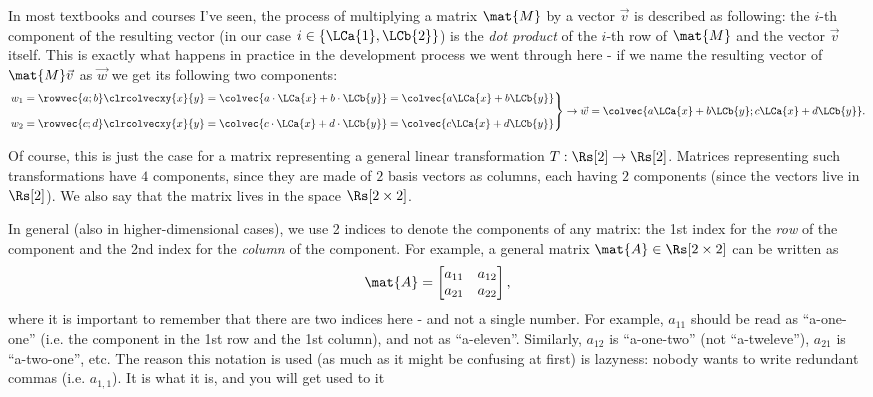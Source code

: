 In most textbooks and courses I've seen, the process of multiplying a matrix $\mat{M}$ by a vector $\vec{v}$ is described as following: the $i$-th component of the resulting vector (in our case $i\in\left\{\LCa{1},\LCb{2}\right\}$) is the \textit{dot product} of the $i$-th row of $\mat{M}$ and the vector $\vec{v}$ itself. This is exactly what happens in practice in the development process we went through here - if we name the resulting vector of $\mat{M}\vec{v}$ as $\vec{w}$ we get its following two components:
\begin{equation}
	\left.
	\begin{aligned}
		w_{1} & = \rowvec{a;b}\clrcolvecxy{x}{y} = \colvec{a\cdot\LCa{x}+b\cdot\LCb{y}} = \colvec{a\LCa{x}+b\LCb{y}} \\[2ex]
		w_{2} & = \rowvec{c;d}\clrcolvecxy{x}{y} = \colvec{c\cdot\LCa{x}+d\cdot\LCb{y}} = \colvec{c\LCa{x}+d\LCb{y}}
		\label{eq:}
	\end{aligned}
	\right\} \rightarrow \vec{w} = \colvec{a\LCa{x}+b\LCb{y};c\LCa{x}+d\LCb{y}}.
\end{equation}

Of course, this is just the case for a matrix representing a general linear transformation $T:\Rs[2]\to\Rs[2]$. Matrices representing such transformations have $4$ components, since they are made of $2$ basis vectors as columns, each having $2$ components (since the vectors live in $\Rs[2]$). We also say that the matrix lives in the space $\Rs[2\times2]$.

In general (also in higher-dimensional cases), we use 2 indices to denote the components of any matrix: the 1st index for the \textit{row} of the component and the 2nd index for the \textit{column} of the component. For example, a general matrix $\mat{A}\in\Rs[2\times2]$ can be written as
\begin{equation}
	\mat{A} = \begin{bmatrix}
		a_{11} & a_{12} \\
		a_{21} & a_{22} \\
	\end{bmatrix},
	\label{eq:general 2x2 matrix with index notation for components}
\end{equation}
where it is important to remember that there are two indices here - and not a single number. For example, $a_{11}$ should be read as \enquote{a-one-one} (i.e. the component in the 1st row and the 1st column), and not as \enquote{a-eleven}. Similarly, $a_{12}$ is \enquote{a-one-two} (not \enquote{a-tweleve}), $a_{21}$ is \enquote{a-two-one}, etc. The reason this notation is used (as much as it might be confusing at first) is lazyness: nobody wants to write redundant commas (i.e. $a_{1,1}$). It is what it is, and you will get used to it \shrug

